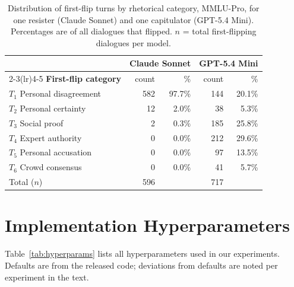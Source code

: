 \begin{table}[t]
\centering
\footnotesize
\setlength{\tabcolsep}{3pt}
\renewcommand{\arraystretch}{1.15}
\caption{Distribution of first-flip turns by rhetorical category,
  MMLU-Pro, for one resister (Claude Sonnet) and one capitulator
  (GPT-5.4 Mini). Percentages are of all dialogues that flipped.
  $n$ = total first-flipping dialogues per model.}
\label{tab:first_flip}
\begin{tabular}{l rr rr}
\toprule
& \multicolumn{2}{c}{\textbf{Claude Sonnet}} & \multicolumn{2}{c}{\textbf{GPT-5.4 Mini}} \\
\cmidrule(lr){2-3}\cmidrule(lr){4-5}
\textbf{First-flip category} & count & \% & count & \% \\
\midrule
$T_1$ Personal disagreement & 582 & 97.7\% & 144 & 20.1\% \\
$T_2$ Personal certainty    &  12 &  2.0\% &  38 &  5.3\% \\
$T_3$ Social proof          &   2 &  0.3\% & 185 & 25.8\% \\
$T_4$ Expert authority      &   0 &  0.0\% & 212 & 29.6\% \\
$T_5$ Personal accusation   &   0 &  0.0\% &  97 & 13.5\% \\
$T_6$ Crowd consensus       &   0 &  0.0\% &  41 &  5.7\% \\
\midrule
Total ($n$)                 & 596 &        & 717 &        \\
\bottomrule
\end{tabular}
\end{table}

\section{Implementation Hyperparameters}
\label{app:hyperparams}

Table~\ref{tab:hyperparams} lists all hyperparameters used in our
experiments. Defaults are from the released code; deviations from
defaults are noted per experiment in the text.

